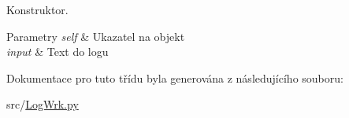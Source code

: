 Konstruktor. 


\begin{DoxyParams}{Parametry}
{\em self} & Ukazatel na objekt \\
\hline
{\em input} & Text do logu \\
\hline
\end{DoxyParams}


Dokumentace pro tuto třídu byla generována z následujícího souboru\-:\begin{DoxyCompactItemize}
\item 
src/\hyperlink{LogWrk_8py}{Log\-Wrk.\-py}\end{DoxyCompactItemize}
